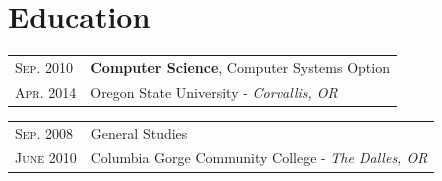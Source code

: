 \documentclass[10pt]{article}
\newenvironment{sectiontable}{ \begin{tabular}{p{16mm}|p{16cm}} }{ \end{tabular} }
\begin{document}

\section{Education}

\begin{sectiontable}

{\small\textsc{Sep. 2010}} & \textbf{Computer Science}, Computer Systems Option\\ 
{\small\textsc{Apr. 2014}}	& Oregon State University - \emph{\small Corvallis, OR}\\

\end{sectiontable}

\begin{sectiontable}

{\small\textsc{Sep. 2008}} & 
General Studies\\ 
{\small\textsc{June 2010}}	& Columbia Gorge Community College - \emph{\small The Dalles, OR}\\

\end{sectiontable}
\end{document}
